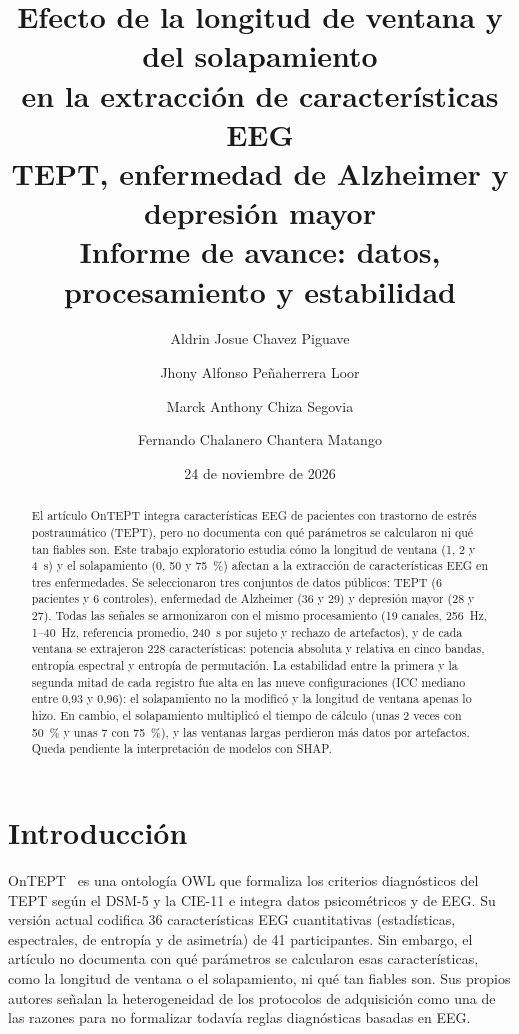 \documentclass[11pt,a4paper]{article}
\title{Efecto de la longitud de ventana y del solapamiento\\en la extracción de características EEG\\[6pt]
  \large TEPT, enfermedad de Alzheimer y depresión mayor\\Informe de avance: datos, procesamiento y estabilidad}
\author{Aldrin Josue Chavez Piguave \and Jhony Alfonso Peñaherrera Loor \and
        Marck Anthony Chiza Segovia \and Fernando Chalanero Chantera Matango}
\date{24 de noviembre de 2026}
\begin{document}
\maketitle

\begin{abstract}
El artículo OnTEPT integra características EEG de pacientes con trastorno de estrés postraumático (TEPT), pero no documenta con qué parámetros se calcularon ni qué tan fiables son. Este trabajo exploratorio estudia cómo la longitud de ventana (1, 2 y 4~s) y el solapamiento (0, 50 y 75~\%) afectan a la extracción de características EEG en tres enfermedades. Se seleccionaron tres conjuntos de datos públicos: TEPT (6 pacientes y 6 controles), enfermedad de Alzheimer (36 y 29) y depresión mayor (28 y 27). Todas las señales se armonizaron con el mismo procesamiento (19 canales, 256~Hz, 1--40~Hz, referencia promedio, 240~s por sujeto y rechazo de artefactos), y de cada ventana se extrajeron 228 características: potencia absoluta y relativa en cinco bandas, entropía espectral y entropía de permutación. La estabilidad entre la primera y la segunda mitad de cada registro fue alta en las nueve configuraciones (ICC mediano entre 0,93 y 0,96): el solapamiento no la modificó y la longitud de ventana apenas lo hizo. En cambio, el solapamiento multiplicó el tiempo de cálculo (unas 2 veces con 50~\% y unas 7 con 75~\%), y las ventanas largas perdieron más datos por artefactos. Queda pendiente la interpretación de modelos con SHAP.
\end{abstract}

\section{Introducción}

OnTEPT~\cite{salazar2026} es una ontología OWL que formaliza los criterios diagnósticos del TEPT según el DSM-5 y la CIE-11 e integra datos psicométricos y de EEG. Su versión actual codifica 36 características EEG cuantitativas (estadísticas, espectrales, de entropía y de asimetría) de 41 participantes. Sin embargo, el artículo no documenta con qué parámetros se calcularon esas características, como la longitud de ventana o el solapamiento, ni qué tan fiables son. Sus propios autores señalan la heterogeneidad de los protocolos de adquisición como una de las razones para no formalizar todavía reglas diagnósticas basadas en EEG.
\end{document}
